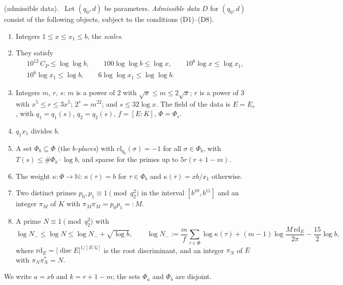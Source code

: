 \documentclass[10pt]{amsart}
\theoremstyle{definition}
\theoremstyle{remark}
\providecommand{\anCP}{C_P}
\providecommand{\anPa}{\Phi_a}
\providecommand{\anPb}{\Phi_b}
\providecommand{\anPl}{\Phi}
\providecommand{\ancl}{\mathrm{cl}}
\providecommand{\anrd}{\mathrm{rd}}
\newenvironment{quoteddef}[2]{\par\medskip\noindent\begingroup
  \textbf{#1}#2.\ \ignorespaces}{\endgroup\par\medskip}
\begin{document}
\begin{quoteddef}{\cite[Definition~13.3]{P46}}{ (admissible data)}
Let $(q_0,d)$ be parameters. \emph{Admissible data} $D$ for $(q_0,d)$ consist
of the following objects, subject to the conditions \textup{(D1)--(D8)}.
\begin{enumerate}
\item[(D1)] Integers $1\le x\le x_1\le b$, the \emph{scales}.
\item[(D2)] They satisfy
\begin{gather*}
 10^{12}\,\anCP\le\log\log b,\qquad 100\log\log b\le\log x,\qquad 10^{6}\log x\le\log x_1,\\
 10^{6}\log x_1\le\log b,\qquad 6\log\log x_1\le\log\log b .
\end{gather*}
\item[(D3)] Integers $m$, $r$, $s$: $m$ is a power of $2$ with
$\sqrt x\le m\le2\sqrt x$; $r$ is a power of $3$ with $x^{5}\le r\le3x^{5}$;
$2^{s}=m^{22}$; and $s\le32\log x$. The field of the data is $E=E_s$, with
$q_1=q_1(s)$, $q_2=q_2(s)$, $f=[E:K]$, $\anPl=\anPl_s$.
\item[(D4)] $q_1x_1$ divides $b$.
\item[(D5)] A set $\anPb\subseteq\anPl$ (the \emph{$b$-places}) with
$\ancl_{q_0}(\sigma)=-1$ for all $\sigma\in\anPb$, with
$T(s)\le\#\anPb\cdot\log b$, and sparse for the primes up to $5r(r+1-m)$.
\item[(D6)] The weight $\kappa\colon\anPl\to\mathbb N$: $\kappa(\tau)=b$ for
$\tau\in\anPb$ and $\kappa(\tau)=xb/x_1$ otherwise.
\item[(D7)] Two distinct primes $p_0,p_1\equiv1\pmod{q_2^{2}}$ in the interval
$[b^{10},b^{11}]$ and an integer $\pi_M$ of $K$ with
$\pi_M\overline{\pi_M}=p_0p_1=:M$.
\item[(D8)] A prime $N\equiv1\pmod{q_2^{2}}$ with
\[
 \log N_-\le\log N\le\log N_-+\sqrt{\log b},\qquad
 \log N_-:=\frac mf\sum_{\tau\in\anPl}\log\kappa(\tau)+(m-1)\log\frac{M\,\anrd_E}{2\pi}-\frac{15}2\log b ,
\]
where $\anrd_E=|\operatorname{disc}E|^{1/[E:\mathbb Q]}$ is the root
discriminant, and an integer $\pi_N$ of $E$ with $\pi_N\pi_N^{*}=N$.
\end{enumerate}
We write $a=xb$ and $k=r+1-m$; the sets $\anPa$ and $\anPb$ are disjoint.
\end{quoteddef}
\end{document}
